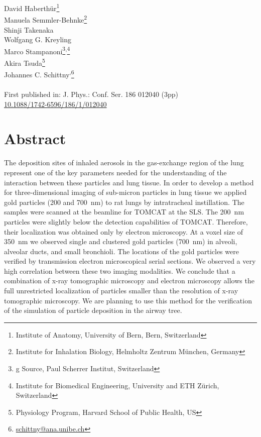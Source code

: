\label{ch:XRM2008}

\newcommand{\footremember}[2]{\footnote{#2}\newcounter{#1}\setcounter{#1}{\value{footnote}}}%
\newcommand{\footrecall}[1]{\footnotemark[\value{#1}]} 

David Haberthür\footremember{ana}{Institute of Anatomy, University of Bern, Bern, Switzerland}\\
Manuela Semmler-Behnke\footremember{inhalation}{Institute for Inhalation Biology, Helmholtz Zentrum München, Germany}\\
Shinji Takenaka\footrecall{inhalation}\\
Wolfgang G. Kreyling\footrecall{inhalation}\\
Marco Stampanoni\footremember{psi}{g Source, Paul Scherrer Institut, Switzerland}\textsuperscript{,}\footremember{eth}{Institute for Biomedical Engineering, University and ETH Zürich, Switzerland}\\
Akira Tsuda\footnote{Physiology Program, Harvard School of Public Health, US}\\
Johannes C. Schittny\footrecall{ana}\textsuperscript{,}\footnote{\href{mailto:schittny@ana.unibe.ch}{schittny@ana.unibe.ch}}\\\\
First published in: J. Phys.: Conf. Ser. 186 012040 (3pp)\\
\href{http://dx.doi.org/10.1088/1742-6596/186/1/012040}{10.1088/1742-6596/186/1/012040}

\section{Abstract}
The deposition sites of inhaled aerosols in the gas-exchange region of the lung represent one of the key parameters needed for the understanding of the interaction between these particles and lung tissue. In order to develop a method for three-dimensional imaging of sub-micron particles in lung tissue we applied gold particles (200 and \SI{700}{\nano\meter}) to rat lungs by intratracheal instillation. The samples were scanned at the beamline for \ac{TOMCAT} at the \acl{SLS}. The \SI{200}{\nano\meter} particles were slightly below the detection capabilities of \acs{TOMCAT}. Therefore, their localization was obtained only by electron microscopy. At a voxel size of \SI{350}{\nano\meter} we observed single and clustered gold particles (\SI{700}{\nano\meter}) in alveoli, alveolar ducts, and small bronchioli. The locations of the gold particles were verified by transmission electron microscopical serial sections. We observed a very high correlation between these two imaging modalities. We conclude that a combination of x-ray tomographic microscopy and electron microscopy allows the full unrestricted \threed localization of particles smaller than the resolution of x-ray tomographic microscopy. We are planning to use this method for the verification of the simulation of particle deposition in the airway tree.

